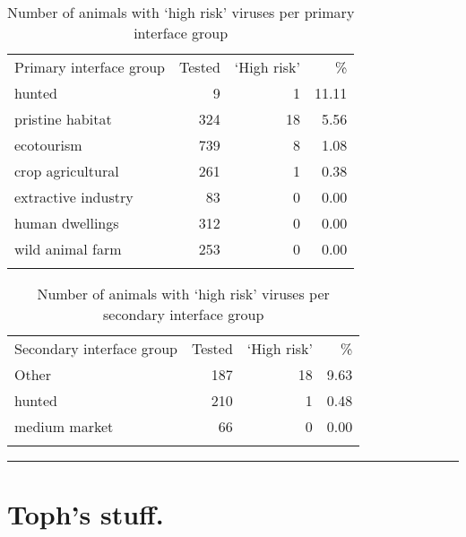 \documentclass[11pt,article,oneside]{article}
\begin{document}
\begin{longtable}[c]{@{}lrrr@{}}
\toprule\addlinespace
Primary interface group & Tested & `High risk' & \%
\\\addlinespace
\midrule\endhead
hunted & 9 & 1 & 11.11
\\\addlinespace
pristine habitat & 324 & 18 & 5.56
\\\addlinespace
ecotourism & 739 & 8 & 1.08
\\\addlinespace
crop agricultural & 261 & 1 & 0.38
\\\addlinespace
extractive industry & 83 & 0 & 0.00
\\\addlinespace
human dwellings & 312 & 0 & 0.00
\\\addlinespace
wild animal farm & 253 & 0 & 0.00
\\\addlinespace
\bottomrule
\addlinespace
\caption{Number of animals with `high risk' viruses per primary
interface group}
\end{longtable}

\begin{longtable}[c]{@{}lrrr@{}}
\toprule\addlinespace
Secondary interface group & Tested & `High risk' & \%
\\\addlinespace
\midrule\endhead
Other & 187 & 18 & 9.63
\\\addlinespace
hunted & 210 & 1 & 0.48
\\\addlinespace
medium market & 66 & 0 & 0.00
\\\addlinespace
\bottomrule
\addlinespace
\caption{Number of animals with `high risk' viruses per secondary
interface group}
\end{longtable}

\begin{center}\rule{3in}{0.4pt}\end{center}

\section{Toph's stuff.}\label{tophs-stuff.}
\end{document}
